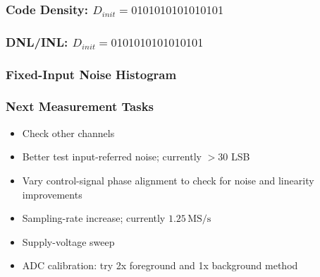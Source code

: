 \begin{frame}
  \frametitle{Code Density: $D_{init}=0101010101010101$}
  \centering
\end{frame}

\begin{frame}
  \frametitle{DNL/INL: $D_{init}=0101010101010101$}
  \centering
\end{frame}

\begin{frame}
  \frametitle{Fixed-Input Noise Histogram}
  \centering
\end{frame}

\begin{frame}
  \frametitle{Next Measurement Tasks}
  \begin{itemize}
    \item Check other channels
    \item Better test input-referred noise; currently $>30$ LSB
    \item Vary control-signal phase alignment to check for noise and linearity improvements
    \item Sampling-rate increase; currently $1.25\,\mathrm{MS/s}$
    \item Supply-voltage sweep
    \item ADC calibration: try 2x foreground and 1x background method
  \end{itemize}
\end{frame}


